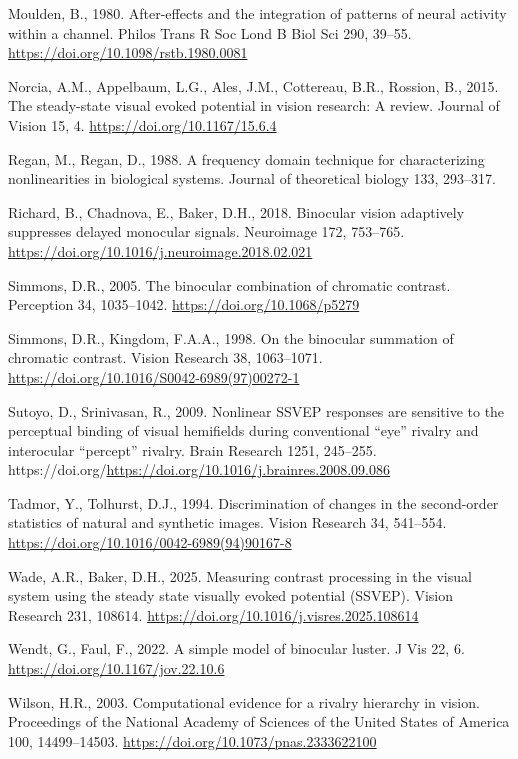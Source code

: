 \documentclass[review,
  12pt,
]{elsarticle}
\newlength{\cslhangindent}
\newenvironment{CSLReferences}[2] %
 {\begin{list}{}{%
  \setlength{\itemindent}{0pt}
  \setlength{\leftmargin}{0pt}
  \setlength{\parsep}{0pt}
  \ifodd #1
   \setlength{\leftmargin}{\cslhangindent}
   \setlength{\itemindent}{-1\cslhangindent}
  \fi
  \setlength{\itemsep}{#2\baselineskip}}}
 {\end{list}}
\begin{document}
\begin{CSLReferences}{1}{0}
Moulden, B., 1980. After-effects and the integration of patterns of
neural activity within a channel. Philos Trans R Soc Lond B Biol Sci
290, 39--55. \url{https://doi.org/10.1098/rstb.1980.0081}

Norcia, A.M., Appelbaum, L.G., Ales, J.M., Cottereau, B.R., Rossion, B.,
2015. The steady-state visual evoked potential in vision research: A
review. Journal of Vision 15, 4. \url{https://doi.org/10.1167/15.6.4}

Regan, M., Regan, D., 1988. A frequency domain technique for
characterizing nonlinearities in biological systems. Journal of
theoretical biology 133, 293--317.

Richard, B., Chadnova, E., Baker, D.H., 2018. Binocular vision
adaptively suppresses delayed monocular signals. Neuroimage 172,
753--765. \url{https://doi.org/10.1016/j.neuroimage.2018.02.021}

Simmons, D.R., 2005. The binocular combination of chromatic contrast.
Perception 34, 1035--1042. \url{https://doi.org/10.1068/p5279}

Simmons, D.R., Kingdom, F.A.A., 1998. On the binocular summation of
chromatic contrast. Vision Research 38, 1063--1071.
\url{https://doi.org/10.1016/S0042-6989(97)00272-1}

Sutoyo, D., Srinivasan, R., 2009. Nonlinear SSVEP responses are
sensitive to the perceptual binding of visual hemifields during
conventional {``eye''} rivalry and interocular {``percept''} rivalry.
Brain Research 1251, 245--255.
https://doi.org/\url{https://doi.org/10.1016/j.brainres.2008.09.086}

Tadmor, Y., Tolhurst, D.J., 1994. Discrimination of changes in the
second-order statistics of natural and synthetic images. Vision Research
34, 541--554. \url{https://doi.org/10.1016/0042-6989(94)90167-8}

Wade, A.R., Baker, D.H., 2025. Measuring contrast processing in the
visual system using the steady state visually evoked potential (SSVEP).
Vision Research 231, 108614.
\url{https://doi.org/10.1016/j.visres.2025.108614}

Wendt, G., Faul, F., 2022. A simple model of binocular luster. J Vis 22,
6. \url{https://doi.org/10.1167/jov.22.10.6}

Wilson, H.R., 2003. Computational evidence for a rivalry hierarchy in
vision. Proceedings of the National Academy of Sciences of the United
States of America 100, 14499--14503.
\url{https://doi.org/10.1073/pnas.2333622100}

\end{CSLReferences}
\end{document}
